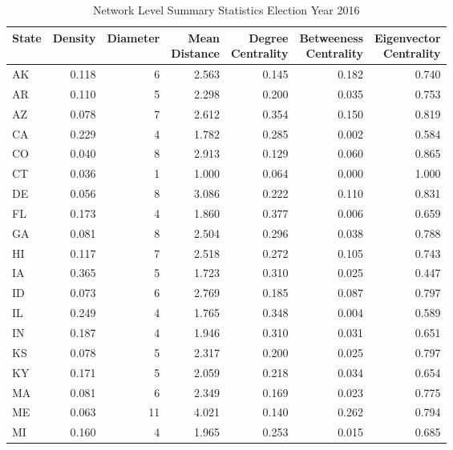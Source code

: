 \documentclass[]{article}
\begin{document}
\begin{table}[!h]

\caption{\label{tab:unnamed-chunk-12}Network Level Summary Statistics 
 Election Year 2016}
\centering
\begin{tabular}{l|r|r|r|r|r|r}
\hline
State & Density & Diameter & \makecell[l]{Mean\\Distance} & \makecell[l]{Degree\\Centrality} & \makecell[l]{Betweeness\\Centrality} & \makecell[l]{Eigenvector\\Centrality}\\
\hline
\rowcolor{gray!6}  AK & 0.118 & 6 & 2.563 & 0.145 & 0.182 & 0.740\\
\hline
AR & 0.110 & 5 & 2.298 & 0.200 & 0.035 & 0.753\\
\hline
\rowcolor{gray!6}  AZ & 0.078 & 7 & 2.612 & 0.354 & 0.150 & 0.819\\
\hline
CA & 0.229 & 4 & 1.782 & 0.285 & 0.002 & 0.584\\
\hline
\rowcolor{gray!6}  CO & 0.040 & 8 & 2.913 & 0.129 & 0.060 & 0.865\\
\hline
CT & 0.036 & 1 & 1.000 & 0.064 & 0.000 & 1.000\\
\hline
\rowcolor{gray!6}  DE & 0.056 & 8 & 3.086 & 0.222 & 0.110 & 0.831\\
\hline
FL & 0.173 & 4 & 1.860 & 0.377 & 0.006 & 0.659\\
\hline
\rowcolor{gray!6}  GA & 0.081 & 8 & 2.504 & 0.296 & 0.038 & 0.788\\
\hline
HI & 0.117 & 7 & 2.518 & 0.272 & 0.105 & 0.743\\
\hline
\rowcolor{gray!6}  IA & 0.365 & 5 & 1.723 & 0.310 & 0.025 & 0.447\\
\hline
ID & 0.073 & 6 & 2.769 & 0.185 & 0.087 & 0.797\\
\hline
\rowcolor{gray!6}  IL & 0.249 & 4 & 1.765 & 0.348 & 0.004 & 0.589\\
\hline
IN & 0.187 & 4 & 1.946 & 0.310 & 0.031 & 0.651\\
\hline
\rowcolor{gray!6}  KS & 0.078 & 5 & 2.317 & 0.200 & 0.025 & 0.797\\
\hline
KY & 0.171 & 5 & 2.059 & 0.218 & 0.034 & 0.654\\
\hline
\rowcolor{gray!6}  MA & 0.081 & 6 & 2.349 & 0.169 & 0.023 & 0.775\\
\hline
ME & 0.063 & 11 & 4.021 & 0.140 & 0.262 & 0.794\\
\hline
\rowcolor{gray!6}  MI & 0.160 & 4 & 1.965 & 0.253 & 0.015 & 0.685\\

\end{tabular}
\end{table}
\end{document}
